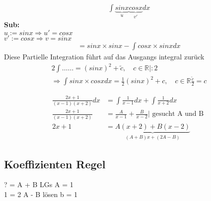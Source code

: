 \begin{example}
\begin{align*}
\int \underbrace{sinx}_{u} \underbrace{cosx}_{v'} dx 
\end{align*}
\textbf{Sub:}\\
$u  := sinx \Rightarrow u' = cosx$\\
$v' := cos x \Rightarrow v = sinx $
\begin{align*}
= sinx \times sinx - \int cos x \times sinx dx 
\end{align*}
Diese Partielle Integration führt auf das Ausgangs integral zurück
\begin{gather*}
2 \int \dots \dots = (sinx)^2 + \tilde{c} , \quad c \in \mathbb{R} | : 2\\
\Rightarrow \int sinx \times cos x dx = \frac{1}{2} (sin x )^2 + c , \quad c \in \mathbb{R} \frac{\tilde{c}}{2} = c
\end{gather*} 
\end{example}
\begin{example}
\begin{align*}
\frac{2x +1}{(x-1)(x+2)}dx &= \int \frac{1}{x-1}dx + \int \frac{1}{x+2}dx\\
\frac{2x+1}{(x-1)(x+2)} &= \frac{A}{x-1}+ \frac{B}{x-2} | \text{ gesucht A und B  }\\
2x+1 &= \underbrace{ A(x+2) + B(x-2)}_{(A+B)x+(2A-B)}  
\end{align*}
\subsection{Koeffizienten Regel}
? = A + B LGs A = 1 \\
1 = 2 A - B lösen b = 1
\end{example}
